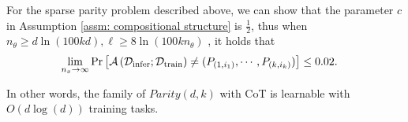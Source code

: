 \begin{corollary}\label{corollary:parity}
For the sparse parity problem described above, we can show that the parameter $c$ in Assumption \ref{assm: compositional structure} is $\frac 12$, thus when $n_\theta\geq d\ln (100kd), \ell \geq 8\ln (100kn_\theta)$ , it holds that
\begin{align*}
\lim_{n_x \to \infty} \Pr\big[ \mathcal{A}\left({\mathcal{D}}_{\mathrm{infer}};{\mathcal{D}}_{\mathrm{train}} \right) \neq (P_{(1,i_1)},\cdots,P_{(k,i_k)}) \big]& \leq 0.02.
\end{align*}
\end{corollary}

In other words, the family of $Parity(d, k)$ with CoT is learnable with ${O}(d \log (d))$ training tasks.



